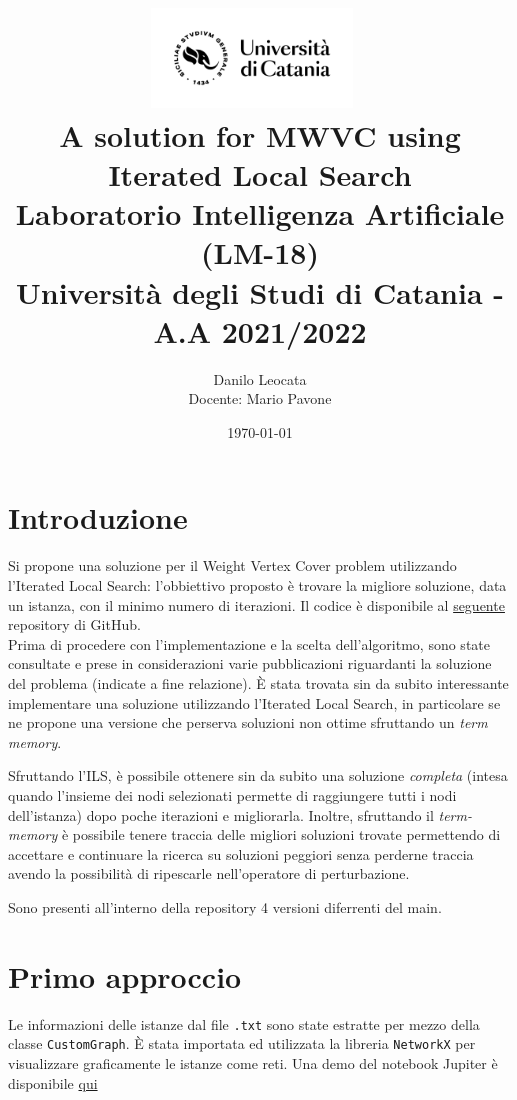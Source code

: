 \documentclass[11pt]{article}
\title{ %
\includegraphics[width=0.4\textwidth]{UniCT-Logo-Nero}~\\
A solution for MWVC using Iterated Local Search \\ 
\large Laboratorio Intelligenza Artificiale (LM-18) \\ Università degli Studi di Catania - A.A 2021/2022 \\
}
\author{ Danilo Leocata \\ Docente: Mario Pavone}
\date{\today}
\begin{document}
\maketitle	
\pagebreak



\section{Introduzione}

Si propone una soluzione per il Weight Vertex Cover problem utilizzando l'Iterated Local Search: l'obbiettivo proposto è trovare la migliore soluzione, data un istanza, con il minimo numero di iterazioni. Il codice è disponibile al \href{https://github.com/khalld/mwvc-using-ils}{seguente} repository di GitHub. \\
Prima di procedere con l'implementazione e la scelta dell'algoritmo, sono state consultate e prese in considerazioni varie pubblicazioni riguardanti la soluzione del problema (indicate a fine relazione). È stata trovata sin da subito interessante implementare una soluzione utilizzando l'Iterated Local Search, in particolare se ne propone una versione che perserva soluzioni non ottime sfruttando un \textit{term memory}.

Sfruttando l'ILS, è possibile ottenere sin da subito una soluzione \textit{completa} (intesa quando l'insieme dei nodi selezionati permette di raggiungere tutti i nodi dell'istanza) dopo poche iterazioni e migliorarla. Inoltre, sfruttando il \textit{term-memory} è possibile tenere traccia delle migliori soluzioni trovate permettendo di accettare e continuare la ricerca su soluzioni peggiori senza perderne traccia avendo la possibilità di ripescarle nell'operatore di perturbazione.

Sono presenti all'interno della repository 4 versioni diferrenti del main.
\pagebreak
\section{Primo approccio}

Le informazioni delle istanze dal file \verb|.txt| sono state estratte per mezzo della classe \verb|CustomGraph|.
È stata importata ed utilizzata la libreria \verb|NetworkX| per visualizzare graficamente le istanze come reti. Una demo del notebook Jupiter è disponibile \href{https://github.com/khalld/mwvc-using-ils/blob/main/visualize-instances.ipynb}{qui}
\end{document}
